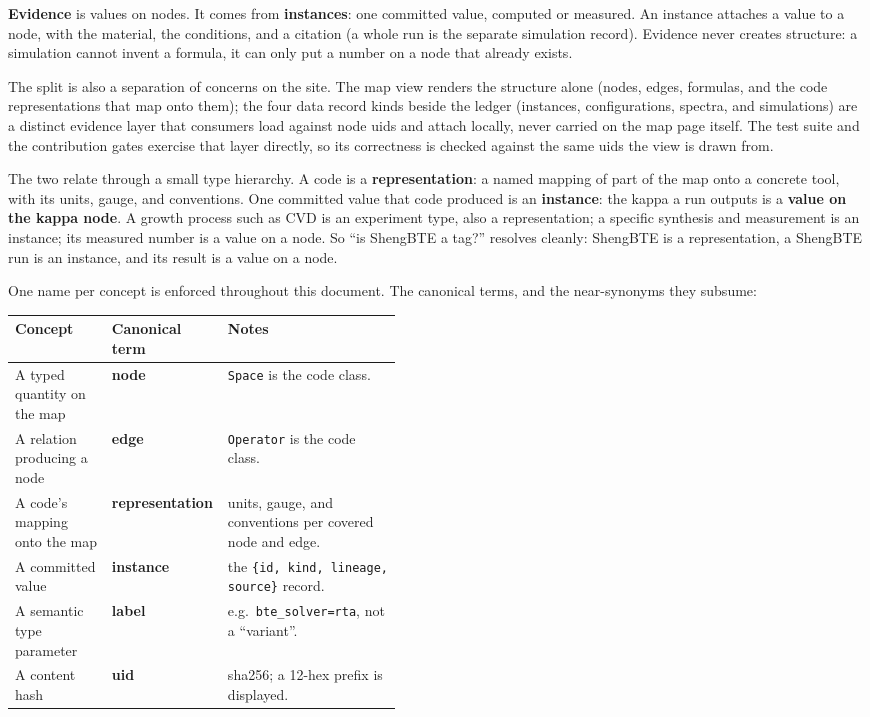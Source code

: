 \documentclass[11pt,a4paper]{article}
\begin{document}
\textbf{Evidence} is values on nodes. It comes from \textbf{instances}: one
committed value, computed or measured. An instance attaches a value to a node,
with the material, the conditions, and a citation (a whole run is the separate
simulation record). Evidence never creates structure: a
simulation cannot invent a formula, it can only put a number on a node that
already exists.

The split is also a separation of concerns on the site. The map view renders the
structure alone (nodes, edges, formulas, and the code representations that map
onto them); the four data record kinds beside the ledger (instances,
configurations, spectra, and simulations) are a distinct evidence layer that
consumers load against node uids and attach locally, never carried on the map
page itself.
The test suite and the contribution gates exercise that layer directly, so its
correctness is checked against the same uids the view is drawn from.

The two relate through a small type hierarchy. A code is a \textbf{representation}: a
named mapping of part of the map onto a concrete tool, with its units, gauge,
and conventions. One committed value that code produced is an \textbf{instance}:
the kappa a run outputs is a \textbf{value on the kappa node}. A growth process such as CVD is an
experiment type, also a representation; a specific synthesis and measurement is
an instance; its measured number is a value on a node. So ``is ShengBTE a tag?''
resolves cleanly: ShengBTE is a representation, a ShengBTE run is an instance,
and its result is a value on a node.

One name per concept is enforced throughout this document. The canonical terms,
and the near-synonyms they subsume:

\begin{center}
\small
\begin{tabular}{llp{0.45\linewidth}}
\toprule
Concept & Canonical term & Notes \\
\midrule
A typed quantity on the map    & \textbf{node} & \texttt{Space} is the code class. \\
A relation producing a node    & \textbf{edge} & \texttt{Operator} is the code class. \\
A code's mapping onto the map  & \textbf{representation} & units, gauge, and conventions per covered node and edge. \\
A committed value               & \textbf{instance} & the \texttt{\{id, kind, lineage, source\}} record. \\
A semantic type parameter       & \textbf{label} & e.g.\ \texttt{bte\_solver=rta}, not a ``variant''. \\
A content hash                  & \textbf{uid} & sha256; a 12-hex prefix is displayed. \\
\bottomrule
\end{tabular}
\end{center}
\end{document}
